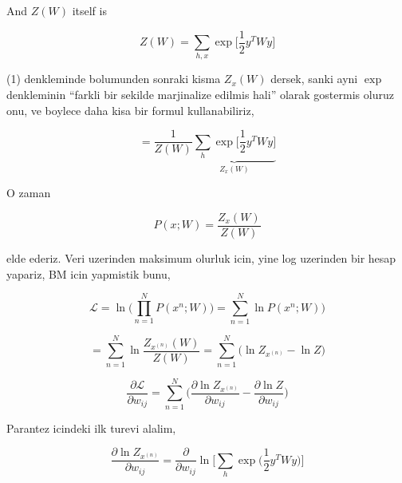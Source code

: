 \documentclass[12pt,fleqn]{article}\usepackage{../common}
\begin{document}
And $Z(W)$ itself is

$$ Z(W) = \sum_{h,x} \exp 
\bigg[ 
\frac{1}{2} y^T W y
\bigg]
$$

(1) denkleminde bolumunden sonraki kisma $Z_x(W)$ dersek, sanki ayni $\exp$
denkleminin ``farkli bir sekilde marjinalize edilmis hali'' olarak
gostermis oluruz onu, ve boylece daha kisa bir formul kullanabiliriz,

$$  
= \frac{1}{Z(W)}  
\underbrace{
\sum_h \exp 
\bigg[ 
\frac{1}{2} y^T W y
\bigg]
}_{Z_x(W)}
$$

O zaman 

$$  
P(x;W) = \frac{Z_x(W)}{Z(W)} 
$$

elde ederiz. Veri uzerinden maksimum olurluk icin, yine log uzerinden bir
hesap yapariz, BM icin yapmistik bunu,

$$  
\mathcal{L} = 
\ln \big( \prod_{n=1}^{N} P(x^{n};W) \big) = 
\sum_{n=1}^{N} \ln P(x^{n};W) \big) 
$$

$$ 
= \sum_{n=1}^{N} \ln \frac{Z_{x^{(n)}}(W)}{Z(W)}  
= \sum_{n=1}^{N}  \big(\ln Z_{x^{(n)}} - \ln Z \big) 
$$


$$ 
\frac{\partial \mathcal{L} }{\partial w_{ij}} = 
 \sum_{n=1}^{N}  \big( \frac{\partial \ln Z_{x^{(n)}} }{\partial w_{ij}}
- \frac{\partial \ln Z }{\partial w_{ij}} \big)
$$

Parantez icindeki ilk turevi alalim,

$$ 
\frac{\partial \ln Z_{x^{(n)}} }{\partial w_{ij}} = 
\frac{\partial }{\partial w_{ij}}  \ln \bigg[ \sum_h \exp \big( \frac{1}{2} y^T W y \big) \bigg]
$$
\end{document}
